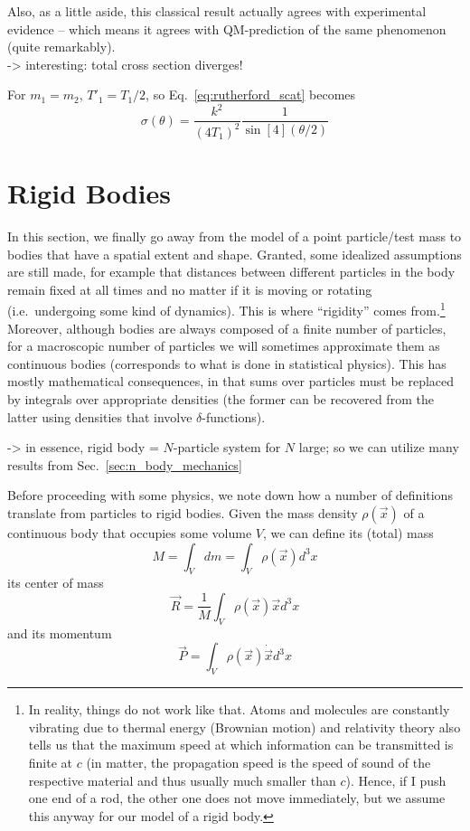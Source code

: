 \documentclass[../class_mech_main.tex]{subfiles}
\begin{document}
Also, as a little aside, this classical result actually agrees with experimental evidence -- which means it agrees with QM-prediction of the same phenomenon (quite remarkably).\\


-> interesting: total cross section diverges!


For $m_1 = m_2$, $T'_1 = T_1/2$, so Eq.~\eqref{eq:rutherford_scat} becomes
\begin{equation}
	\sigma(\theta) = \frac{k^2}{(4 T_1)^2} \frac{1}{\sin[4](\theta/2)}
\end{equation}



    \section{Rigid Bodies}
In this section, we finally go away from the model of a point particle/test mass to bodies that have a spatial extent and shape. Granted, some idealized assumptions are still made, for example that distances between different particles in the body remain fixed at all times and no matter if it is moving or rotating (i.e.~undergoing some kind of dynamics). This is where \enquote{rigidity} comes from.\footnote{In reality, things do not work like that. Atoms and molecules are constantly vibrating due to thermal energy (Brownian motion) and relativity theory also tells us that the maximum speed at which information can be transmitted is finite at $c$ (in matter, the propagation speed is the speed of sound of the respective material and thus usually much smaller than $c$). Hence, if I push one end of a rod, the other one does not move immediately, but we assume this anyway for our model of a rigid body.} Moreover, although bodies are always composed of a finite number of particles, for a macroscopic number of particles we will sometimes approximate them as continuous bodies (corresponds to what is done in statistical physics). This has mostly mathematical consequences, in that sums over particles must be replaced by integrals over appropriate densities (the former can be recovered from the latter using densities that involve $\delta$-functions).


-> in essence, rigid body = $N$-particle system for $N$ large; so we can utilize many results from Sec.~\ref{sec:n_body_mechanics}


Before proceeding with some physics, we note down how a number of definitions translate from particles to rigid bodies. Given the mass density $\rho(\vec{x})$ of a continuous body that occupies some volume $V$, we can define its (total) mass
\begin{equation}
	M = \int_V dm
	= \int_V \rho(\vec{x}) d^3x
\end{equation}
its center of mass
\begin{equation}
	\vec{R} = \frac{1}{M} \int_V \rho(\vec{x}) \vec{x} d^3x
\end{equation}
and its momentum
\begin{equation}
	\vec{P} = \int_V \rho(\vec{x}) \dot{\vec{x}} d^3x
\end{equation}
\end{document}
